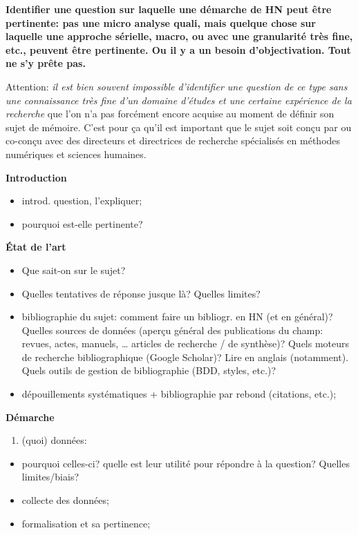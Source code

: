 \documentclass[a4paper,twoside,12pt]{book}
\begin{document}
\textbf{Identifier une question sur laquelle une démarche de HN peut être pertinente: pas une micro analyse quali, mais quelque chose sur laquelle une approche sérielle, macro, ou avec une granularité très fine, etc., peuvent être pertinente. Ou il y a un besoin d'objectivation. 
	Tout ne s'y prête pas.}

Attention: \emph{il est bien souvent impossible d'identifier une question de ce type sans une connaissance très fine d'un domaine d'études et une certaine expérience de la recherche} que l'on n'a pas forcément encore acquise au moment de définir son sujet de mémoire. C'est pour ça qu'il est important que le sujet soit conçu par ou co-conçu avec des directeurs et directrices de recherche spécialisés en méthodes numériques et sciences humaines.

\textbf{Introduction}

\begin{itemize}
	\item
	introd. question, l'expliquer;
	\item
	pourquoi est-elle pertinente?
\end{itemize}

\textbf{État de l'art}

\begin{itemize}
	\item
	Que sait-on sur le sujet?
	\item
	Quelles tentatives de réponse jusque là? Quelles limites?
	\item
	bibliographie du sujet: comment faire un bibliogr. en HN (et en général)? Quelles sources de données (aperçu général des publications du champ: revues, actes, manuels, … articles de recherche / de synthèse)? Quels moteurs de recherche bibliographique (Google Scholar)? Lire en anglais (notamment). Quels outils de gestion de bibliographie (BDD, styles, etc.)? 
	\item dépouillements systématiques + bibliographie par rebond (citations, etc.);
\end{itemize}

\textbf{Démarche}

\begin{enumerate}
	\item
	(quoi) données:
\end{enumerate}

\begin{itemize}
	\item
	pourquoi celles-ci? quelle est leur utilité pour répondre à la
	question? Quelles limites/biais?
	\item 
	collecte des données;
	\item
	formalisation et sa pertinence;
\end{itemize}
\end{document}

